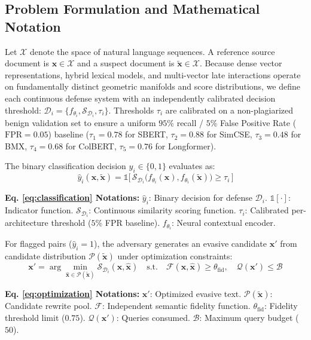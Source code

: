 \documentclass[conference,onecolumn,11pt]{IEEEtran}
\newcommand{\notationblock}[1]{\begin{notationbox}#1\end{notationbox}}
\begin{document}
\subsection{Problem Formulation and Mathematical Notation}
Let $\mathcal{X}$ denote the space of natural language sequences. A reference source document is $\mathbf{x} \in \mathcal{X}$ and a suspect document is $\mathbf{\tilde{x}} \in \mathcal{X}$. Because dense vector representations, hybrid lexical models, and multi-vector late interactions operate on fundamentally distinct geometric manifolds and score distributions, we define each continuous defense system with an independently calibrated decision threshold: $\mathcal{D}_i = \{f_{\theta_i}, \mathcal{S}_{\mathcal{D}_i}, \tau_i\}$. Thresholds $\tau_i$ are calibrated on a non-plagiarized benign validation set to ensure a uniform $95\%$ recall / $5\%$ False Positive Rate ($\text{FPR} = 0.05$) baseline ($\tau_1 = 0.78$ for SBERT, $\tau_2 = 0.88$ for SimCSE, $\tau_3 = 0.48$ for BMX, $\tau_4 = 0.68$ for ColBERT, $\tau_5 = 0.76$ for Longformer).

The binary classification decision $\hat{y}_i \in \{0, 1\}$ evaluates as:
\begin{equation}
    \hat{y}_i(\mathbf{x}, \mathbf{\tilde{x}}) = \mathbb{1}\big[\, \mathcal{S}_{\mathcal{D}_i}\big(f_{\theta_i}(\mathbf{x}), f_{\theta_i}(\mathbf{\tilde{x}})\big) \ge \tau_i \,\big]
    \label{eq:classification}
\end{equation}
\notationblock{\textbf{Eq. \eqref{eq:classification} Notations:} $\hat{y}_i$: Binary decision for defense $\mathcal{D}_i$. $\mathbb{1}[\cdot]$: Indicator function. $\mathcal{S}_{\mathcal{D}_i}$: Continuous similarity scoring function. $\tau_i$: Calibrated per-architecture threshold ($5\%$ FPR baseline). $f_{\theta_i}$: Neural contextual encoder.}

For flagged pairs ($\hat{y}_i = 1$), the adversary generates an evasive candidate $\mathbf{x}'$ from candidate distribution $\mathcal{P}(\mathbf{\tilde{x}})$ under optimization constraints:
\begin{equation}
    \mathbf{x}' = \arg\min_{\mathbf{\hat{x}} \in \mathcal{P}(\mathbf{\tilde{x}})} \mathcal{S}_{\mathcal{D}_i}(\mathbf{x}, \mathbf{\hat{x}}) \quad \text{s.t.} \quad \mathcal{F}(\mathbf{x}, \mathbf{\hat{x}}) \ge \theta_{\text{fid}}, \quad \mathcal{Q}(\mathbf{x}') \le \mathcal{B}
    \label{eq:optimization}
\end{equation}
\notationblock{\textbf{Eq. \eqref{eq:optimization} Notations:} $\mathbf{x}'$: Optimized evasive text. $\mathcal{P}(\mathbf{\tilde{x}})$: Candidate rewrite pool. $\mathcal{F}$: Independent semantic fidelity function. $\theta_{\text{fid}}$: Fidelity threshold limit ($0.75$). $\mathcal{Q}(\mathbf{x}')$: Queries consumed. $\mathcal{B}$: Maximum query budget ($50$).}
\end{document}
